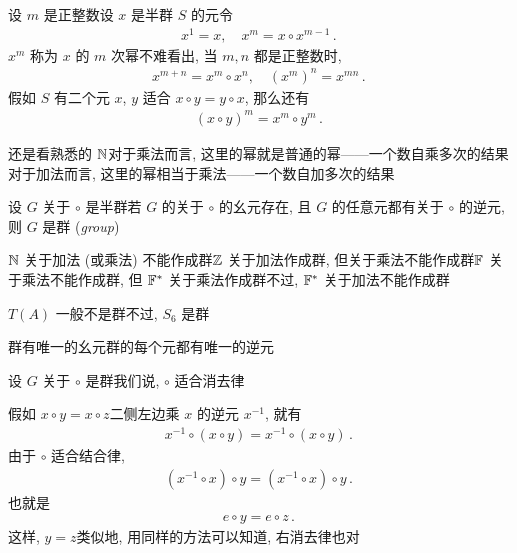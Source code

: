 \begin{definition}
    设 $m$ 是正整数\period 设 $x$ 是半群 $S$ 的元\period 令
    \begin{align*}
        x^{1} = x, \quad x^{m} = x \circ x^{m-1} \period
    \end{align*}
    $x^{m}$ 称为 $x$ 的 $m$ 次幂\period 不难看出, 当 $m,n$ 都是正整数时,
    \begin{align*}
        x^{m+n} = x^m \circ x^n, \quad (x^m)^n = x^{mn} \period
    \end{align*}
    假如 $S$ 有二个元 $x$, $y$ 适合 $x \circ y = y \circ x$, 那么还有
    \begin{align*}
        (x \circ y)^m = x^m \circ y^m \period
    \end{align*}
\end{definition}

\begin{example}
    还是看熟悉的 $\mathbb{N}$\period 对于乘法而言, 这里的幂就是普通的幂——一个数自乘多次的结果\period 对于加法而言, 这里的幂相当于乘法——一个数自加多次的结果\period
\end{example}

\begin{definition}
    设 $G$ 关于 $\circ$ 是半群\period 若 $G$ 的关于 $\circ$ 的幺元存在, 且 $G$ 的任意元都有关于 $\circ$ 的逆元, 则 $G$ 是群 (\textit{group})\period
\end{definition}

\begin{example}
    $\mathbb{N}$ 关于加法 (或乘法) 不能作成群\period $\mathbb{Z}$ 关于加法作成群, 但关于乘法不能作成群\period $\mathbb{F}$ 关于乘法不能作成群, 但 $\mathbb{F}^{\ast}$ 关于乘法作成群\period 不过, $\mathbb{F}^{\ast}$ 关于加法不能作成群\period
\end{example}

\begin{example}
    $T(A)$ 一般不是群\period 不过, $S_6$ 是群\period
\end{example}

\begin{remark}
    群有唯一的幺元\period 群的每个元都有唯一的逆元\period
\end{remark}

\begin{remark}
    设 $G$ 关于 $\circ$ 是群\period 我们说, $\circ$ 适合消去律\period

    假如 $x \circ y = x \circ z$\period 二侧左边乘 $x$ 的逆元 $x^{-1}$, 就有
    \begin{align*}
        x^{-1} \circ (x \circ y) = x^{-1} \circ (x \circ y) \period
    \end{align*}
    由于 $\circ$ 适合结合律,
    \begin{align*}
        (x^{-1} \circ x) \circ y = (x^{-1} \circ x) \circ y \period
    \end{align*}
    也就是
    \begin{align*}
        e \circ y = e \circ z \period
    \end{align*}
    这样, $y = z$\period 类似地, 用同样的方法可以知道, 右消去律也对\period
\end{remark}


